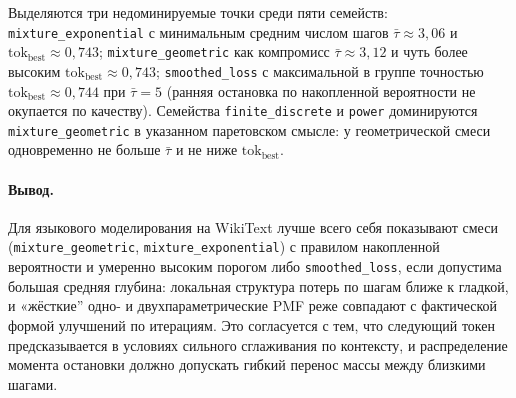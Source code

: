 Выделяются три недоминируемые точки среди пяти семейств: \texttt{mixture\_exponential} с минимальным средним числом шагов \(\bar{\tau}{\approx}3{,}06\) и \(\mathrm{tok}_{\mathrm{best}}{\approx}0{,}743\); \texttt{mixture\_geometric} как компромисс \(\bar{\tau}{\approx}3{,}12\) и чуть более высоким \(\mathrm{tok}_{\mathrm{best}}{\approx}0{,}743\); \texttt{smoothed\_loss} с максимальной в группе точностью \(\mathrm{tok}_{\mathrm{best}}{\approx}0{,}744\) при \(\bar{\tau}{=}5\) (ранняя остановка по накопленной вероятности не окупается по качеству). Семейства \texttt{finite\_discrete} и \texttt{power} доминируются \texttt{mixture\_geometric} в указанном паретовском смысле: у геометрической смеси одновременно не больше \(\bar{\tau}\) и не ниже \(\mathrm{tok}_{\mathrm{best}}\).

\paragraph{Вывод.}
Для языкового моделирования на WikiText лучше всего себя показывают смеси (\texttt{mixture\_geometric}, \texttt{mixture\_exponential}) с правилом накопленной вероятности и умеренно высоким порогом либо \texttt{smoothed\_loss}, если допустима большая средняя глубина: локальная структура потерь по шагам ближе к гладкой, и «жёсткие'' одно- и двухпараметрические PMF реже совпадают с фактической формой улучшений по итерациям. Это согласуется с тем, что следующий токен предсказывается в условиях сильного сглаживания по контексту, и распределение момента остановки должно допускать гибкий перенос массы между близкими шагами.
